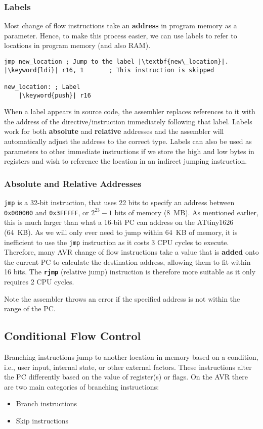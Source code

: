 \documentclass{article}
\newcommand{\keyword}[1]{\textcolor[rgb]{0.00,0.50,0.00}{\textbf{#1}}}
\newcommand{\keywordinline}[1]{\textcolor[rgb]{0.00,0.50,0.00}{\textbf{\texttt{#1}}}}
\begin{document}
\subsubsection{Labels}
Most change of flow instructions take an \textbf{address} in program
memory as a parameter. Hence, to make this process easier, we can use
labels to refer to locations in program memory (and also RAM).
\begin{verbatim}
jmp new_location ; Jump to the label |\textbf{new\_location}|.
|\keyword{ldi}| r16, 1       ; This instruction is skipped

new_location: ; Label
    |\keyword{push}| r16
\end{verbatim}
When a label appears in source code, the assembler replaces references
to it with the address of the directive/instruction immediately
following that label. Labels work for both \textbf{absolute} and
\textbf{relative} addresses and the assembler will automatically adjust
the address to the correct type. Labels can also be used as parameters
to other immediate instructions if we store the high and low bytes in
registers and wish to reference the location in an indirect jumping
instruction.
\subsubsection{Absolute and Relative Addresses}
\texttt{jmp} is a 32-bit instruction, that uses 22 bits to
specify an address between \texttt{0x000000} and
\texttt{0x3FFFFF}, or \(2^{23} - 1\) bits of memory
(\qty{8}{MB}). As mentioned earlier, this is much larger
than what a 16-bit PC can address on the ATtiny1626 (\qty{64}{KB}).
As we will only ever need to jump within \qty{64}{KB} of memory, it is
inefficient to use the \texttt{jmp} instruction as it
costs 3 CPU cycles to execute. Therefore, many AVR change of flow
instructions take a value that is \textbf{added} onto the current PC to
calculate the destination address, allowing them to fit within 16 bits.
The \keywordinline{rjmp} (relative jump) instruction is therefore more
suitable as it only requires 2 CPU cycles.

Note the assembler throws an error if the specified address is not
within the range of the PC\@.
\subsection{Conditional Flow Control}
Branching instructions jump to another location in memory based on a
condition, i.e., user input, internal state, or other external factors.
These instructions alter the PC differently based on the value of
register(s) or flags. On the AVR there are two main categories of
branching instructions:
\begin{itemize}
    \item Branch instructions
    \item Skip instructions
\end{itemize}
\end{document}
